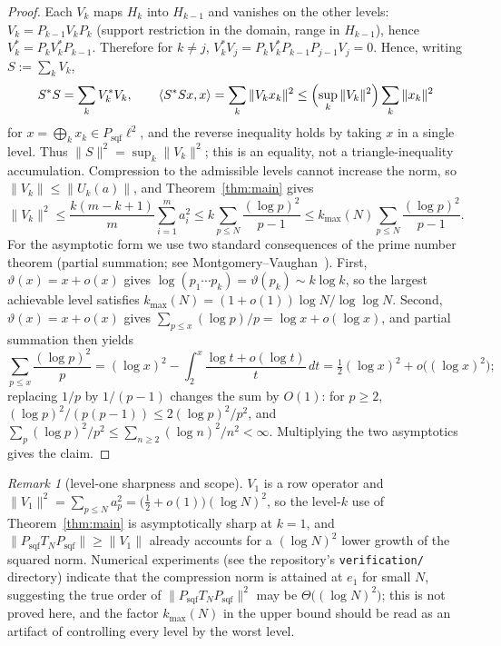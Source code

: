 \documentclass[11pt]{article}
\theoremstyle{remark}
\newtheorem{remark}{Remark}
\begin{document}
\begin{proof}
Each $V_k$ maps $H_k$ into $H_{k-1}$ and vanishes on the other levels:
$V_k=P_{k-1}V_kP_k$ (support restriction in the domain, range in $H_{k-1}$),
hence $V_k^{*}=P_kV_k^{*}P_{k-1}$. Therefore for $k\ne j$,
$V_k^{*}V_j=P_kV_k^{*}P_{k-1}P_{j-1}V_j=0$. Hence, writing $S:=\sum_k V_k$,
\[
S^{*}S=\sum_{k}V_k^{*}V_k,
\qquad
\langle S^{*}S x,x\rangle=\sum_k \|V_k x_k\|^2
\le \Bigl(\sup_k\|V_k\|^2\Bigr)\sum_k\|x_k\|^2
\]
for $x=\bigoplus_k x_k\in P_{\mathrm{sqf}}\ell^2$, and the reverse
inequality holds by taking $x$ in a single level. Thus
$\|S\|^2=\sup_k\|V_k\|^2$; this is an equality, not a triangle-inequality
accumulation. Compression to the admissible levels cannot increase the
norm, so $\|V_k\|\le\|U_k(a)\|$, and Theorem~\ref{thm:main} gives
\[
\|V_k\|^2\le \frac{k(m-k+1)}{m}\sum_{i=1}^{m}a_i^2
\le k\sum_{p\le N}\frac{(\log p)^2}{p-1}
\le k_{\max}(N)\sum_{p\le N}\frac{(\log p)^2}{p-1}.
\]
For the asymptotic form we use two standard consequences of the prime
number theorem (partial summation; see
Montgomery--Vaughan~\cite{montgomeryvaughan2007}). First,
$\vartheta(x)=x+o(x)$ gives
$\log(p_1\cdots p_k)=\vartheta(p_k)\sim k\log k$, so the largest
achievable level satisfies
$k_{\max}(N)=(1+o(1))\log N/\log\log N$. Second,
$\vartheta(x)=x+o(x)$ gives $\sum_{p\le x}(\log p)/p=\log x+o(\log x)$,
and partial summation then yields
\[
\sum_{p\le x}\frac{(\log p)^2}{p}
=(\log x)^2-\int_2^x\frac{\log t+o(\log t)}{t}\,dt
=\tfrac12(\log x)^2+o\bigl((\log x)^2\bigr);
\]
replacing $1/p$ by $1/(p-1)$ changes the sum by $O(1)$: for $p\ge2$,
$(\log p)^2/(p(p-1))\le 2(\log p)^2/p^2$, and
$\sum_p(\log p)^2/p^2\le\sum_{n\ge2}(\log n)^2/n^2<\infty$. Multiplying the two asymptotics
gives the claim.
\end{proof}

\begin{remark}[level-one sharpness and scope]\label{rem:scope}
$V_1$ is a row operator and $\|V_1\|^2=\sum_{p\le N}a_p^2
=\bigl(\tfrac12+o(1)\bigr)(\log N)^2$, so the level-$k$ use of
Theorem~\ref{thm:main} is asymptotically sharp at $k=1$, and
$\|P_{\mathrm{sqf}}T_NP_{\mathrm{sqf}}\|\ge\|V_1\|$ already accounts for
a $(\log N)^2$ lower growth of the squared norm. Numerical experiments
(see the repository's \texttt{verification/} directory) indicate that the
compression norm is attained at $e_1$ for small $N$, suggesting the true
order of $\|P_{\mathrm{sqf}}T_NP_{\mathrm{sqf}}\|^2$ may be
$\Theta\bigl((\log N)^2\bigr)$; this is not proved here, and the factor
$k_{\max}(N)$ in the upper bound should be read as an artifact of
controlling every level by the worst level.
\end{remark}
\end{document}
